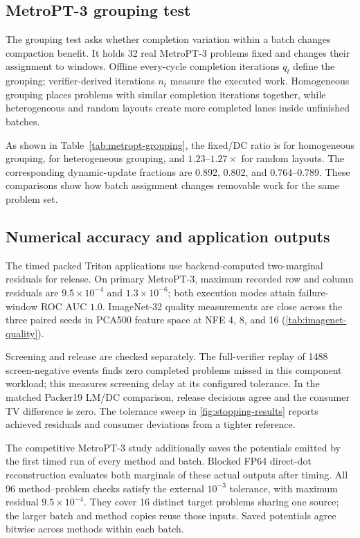 \subsection{MetroPT-3 grouping test}
\label{sec:grouping-results}

The grouping test asks whether completion variation within a batch changes compaction benefit. It holds 32 real MetroPT-3 problems fixed and changes their assignment to windows. Offline every-cycle completion iterations $q_t$ define the grouping; verifier-derived iterations $n_t$ measure the executed work. Homogeneous grouping places problems with similar completion iterations together, while heterogeneous and random layouts create more completed lanes inside unfinished batches.

As shown in Table~\ref{tab:metropt-grouping}, the fixed/DC ratio is \CMThreeHomogeneousRetirementSpeedup{} for homogeneous grouping, \CMThreeHeterogeneousRetirementSpeedup{} for heterogeneous grouping, and $1.23$--$1.27\times$ for random layouts. The corresponding dynamic-update fractions are 0.892, 0.802, and 0.764--0.789. These comparisons show how batch assignment changes removable work for the same problem set.



\subsection{Numerical accuracy and application outputs}
\label{sec:numerical-results}

The timed packed Triton applications use backend-computed two-marginal residuals for release. On primary MetroPT-3, maximum recorded row and column residuals are $9.5\times10^{-4}$ and $1.3\times10^{-6}$; both execution modes attain failure-window ROC AUC $1.0$. ImageNet-32 quality measurements are close across the three paired seeds in PCA500 feature space at NFE 4, 8, and 16 (\cref{tab:imagenet-quality}).

Screening and release are checked separately. The full-verifier replay of 1488 screen-negative events finds zero completed problems missed in this component workload; this measures screening delay at its configured tolerance. In the matched Packer19 LM/DC comparison, release decisions agree and the consumer TV difference is zero. The tolerance sweep in \cref{fig:stopping-results} reports achieved residuals and consumer deviations from a tighter reference.

The competitive MetroPT-3 study additionally saves the potentials emitted by the first timed run of every method and batch. Blocked FP64 direct-dot reconstruction evaluates both marginals of these actual outputs after timing. All 96 method--problem checks satisfy the external $10^{-3}$ tolerance, with maximum residual $9.5\times10^{-4}$. They cover 16 distinct target problems sharing one source; the larger batch and method copies reuse those inputs. Saved potentials agree bitwise across methods within each batch.

